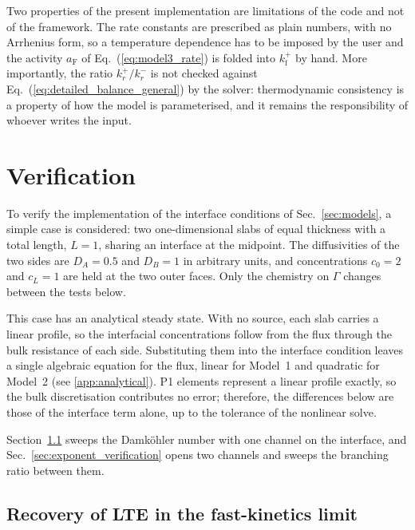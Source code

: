 \documentclass[5p]{elsarticle}
\begin{document}
Two properties of the present implementation are limitations of the code and not of the framework.
The rate constants are prescribed as plain numbers, with no Arrhenius form, so a temperature dependence has to be imposed by the user and the activity $a_\mathrm{F}$ of Eq.~(\ref{eq:model3_rate}) is folded into $k_\mathrm{f}^{+}$ by hand.
More importantly, the ratio $k_r^{+}/k_r^{-}$ is not checked against Eq.~(\ref{eq:detailed_balance_general}) by the solver: thermodynamic consistency is a property of how the model is parameterised, and it remains the responsibility of whoever writes the input.

\section{Verification}
\label{sec:verification}

To verify the implementation of the interface conditions of Sec.~\ref{sec:models}, a simple case is considered: two one-dimensional slabs of equal thickness with a total length, $L = 1$, sharing an interface at the midpoint.
The diffusivities of the two sides are $D_A = 0.5$ and $D_B = 1$ in arbitrary units, and concentrations $c_0 = 2$ and $c_L = 1$ are held at the two outer faces.
Only the chemistry on $\Gamma$ changes between the tests below.

This case has an analytical steady state.
With no source, each slab carries a linear profile, so the interfacial concentrations follow from the flux through the bulk resistance of each side.
Substituting them into the interface condition leaves a single algebraic equation for the flux, linear for Model~1 and quadratic for Model~2 (see \ref{app:analytical}).
P1 elements represent a linear profile exactly, so the bulk discretisation contributes no error; therefore, the differences below are those of the interface term alone, up to the tolerance of the nonlinear solve.

Section~\ref{sec:lte_limit} sweeps the Damk\"ohler number with one channel on the interface, and Sec.~\ref{sec:exponent_verification} opens two channels and sweeps the branching ratio between them.

\subsection{Recovery of LTE in the fast-kinetics limit}
\label{sec:lte_limit}
\end{document}
